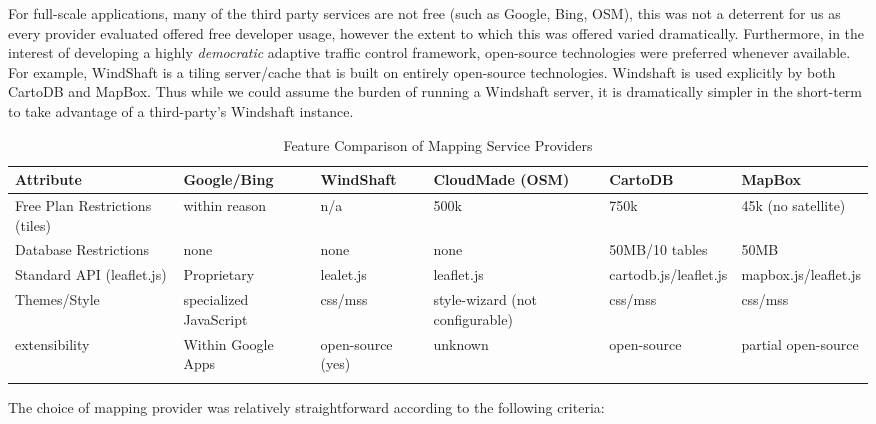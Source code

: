 \documentclass{article}
\begin{document}
For full-scale applications, many of the third party services are not free (such as Google, Bing, OSM), this was not a deterrent for us as every provider evaluated offered free developer usage, however the extent to which this was offered varied dramatically.
Furthermore, in the interest of developing a highly \emph{democratic} adaptive traffic control framework, open-source technologies were preferred whenever available.
For example, WindShaft is a tiling server/cache that is built on entirely open-source technologies.
Windshaft is used explicitly by both CartoDB and MapBox.
Thus while we could assume the burden of running a Windshaft server, it is dramatically simpler in the short-term to take advantage of a third-party's Windshaft instance.\\ 

\begin{longtable}{|p{2.6cm}|p{2.1cm}|p{2cm}|p{2cm}|p{2.8cm}|p{2.8cm}|} \hline
    \textbf{Attribute}                        & \textbf{Google/Bing}            & \textbf{WindShaft}         & \textbf{CloudMade (OSM)}                 & \textbf{CartoDB}               & \textbf{MapBox}               \\ \hline
    Free Plan Restrictions (tiles) & within reason          & n/a               & 500k                            & 750k                  & 45k (no satellite)   \\ \hline
    Database Restrictions            & none                   & none              & none                            & 50MB/10 tables        & 50MB                 \\ \hline
    Standard API (leaflet.js)        & Proprietary            & lealet.js         & leaflet.js                      & cartodb.js/leaflet.js & mapbox.js/leaflet.js \\ \hline
    Themes/Style                     & specialized JavaScript & css/mss           & style-wizard (not configurable) & css/mss               & css/mss              \\ \hline
    extensibility                    & Within Google Apps     & open-source (yes) & unknown                         & open-source           & partial open-source  \\ \hline
    \caption{Feature Comparison of Mapping Service Providers}
    \label{tab:Map_Provider_Attributes}
\end{longtable}

The choice of mapping provider was relatively straightforward according to the following criteria:\\
\end{document}
